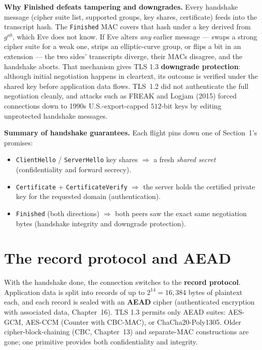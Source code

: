 \begin{whybox}
\textbf{Why Finished defeats tampering and downgrades.} Every handshake message
(cipher suite list, supported groups, key shares, certificate) feeds into the
transcript hash. The \texttt{Finished} MAC covers that hash under a key derived
from $g^{ab}$, which Eve does not know. If Eve alters \emph{any} earlier message ---
swaps a strong cipher suite for a weak one, strips an elliptic-curve group, or flips
a bit in an extension --- the two sides' transcripts diverge, their MACs disagree,
and the handshake aborts. That mechanism gives TLS 1.3 \textbf{downgrade
protection}: although initial negotiation happens in cleartext, its outcome is
verified under the shared key before application data flows. TLS~1.2 did not
authenticate the full negotiation cleanly, and attacks such as FREAK and Logjam
(2015) forced connections down to 1990s U.S.-export-capped $512$-bit keys by
editing unprotected handshake messages.
\end{whybox}

\begin{focusbox}
\textbf{Summary of handshake guarantees.} Each flight pins down one of Section~1's
promises:
\begin{itemize}
\item \texttt{ClientHello} / \texttt{ServerHello} key shares $\Rightarrow$ a fresh
\emph{shared secret} (confidentiality and forward secrecy).
\item \texttt{Certificate} + \texttt{CertificateVerify} $\Rightarrow$ the server
holds the certified private key for the requested domain (authentication).
\item \texttt{Finished} (both directions) $\Rightarrow$ both peers saw the exact
same negotiation bytes (handshake integrity and downgrade protection).
\end{itemize}
\end{focusbox}

\section{The record protocol and AEAD}

With the handshake done, the connection switches to the \textbf{record protocol}.
Application data is split into records of up to $2^{14} = 16{,}384$ bytes of
plaintext each, and each record is sealed with an \textbf{AEAD} cipher
(authenticated encryption with associated data, Chapter~16). TLS 1.3 permits only
AEAD suites: AES-GCM, AES-CCM (Counter with CBC-MAC), or ChaCha20-Poly1305. Older
cipher-block-chaining (CBC, Chapter~13) and separate-MAC constructions are gone;
one primitive provides both confidentiality and integrity.

